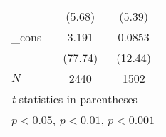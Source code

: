 {\begin{tabular}{l*{2}{c}}
            &      (5.68)         &      (5.39)         \\
[1em]
\_cons      &       3.191\sym{***}&      0.0853\sym{***}\\
            &     (77.74)         &     (12.44)         \\
\hline
\(N\)       &        2440         &        1502         \\
\hline\hline
\multicolumn{3}{l}{\footnotesize \textit{t} statistics in parentheses}\\
\multicolumn{3}{l}{\footnotesize \sym{*} \(p<0.05\), \sym{**} \(p<0.01\), \sym{***} \(p<0.001\)}\\
\end{tabular}
}
